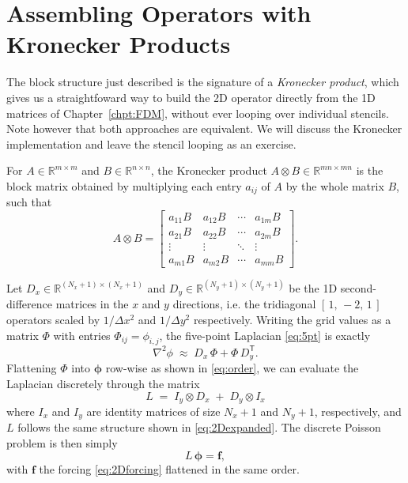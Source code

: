 \section{Assembling Operators with Kronecker Products}
\label{sec:kron}

The block structure just described is the
signature of a \emph{Kronecker product}, which gives us a straightfoward way to build the 2D
operator directly from the 1D matrices of Chapter~\ref{chpt:FDM}, without ever
looping over individual stencils. Note however that both approaches are equivalent. We will discuss the Kronecker implementation and leave the stencil looping as an exercise.

\clearpage 

\begin{definition}
For $A\in\mathbb{R}^{m\times m}$ and $B\in\mathbb{R}^{n\times n}$, the
Kronecker product $A\otimes B\in\mathbb{R}^{mn\times mn}$ is the block matrix
obtained by multiplying each entry $a_{ij}$ of $A$ by the whole matrix $B$, such that
\[
    A\otimes B =
    \begin{bmatrix}
        a_{11}B & a_{12}B & \cdots & a_{1m}B\\
        a_{21}B & a_{22}B & \cdots & a_{2m}B\\
        \vdots  & \vdots  & \ddots & \vdots \\
        a_{m1}B & a_{m2}B & \cdots & a_{mm}B
    \end{bmatrix}.
\]
\end{definition}

Let $D_x\in\mathbb{R}^{(N_x+1)\times(N_x+1)}$ and
$D_y\in\mathbb{R}^{(N_y+1)\times(N_y+1)}$ be the 1D second-difference matrices
in the $x$ and $y$ directions, i.e. the
tridiagonal $[\,1,\,-2,\,1\,]$ operators scaled by $1/\Delta x^2$ and
$1/\Delta y^2$ respectively. Writing the grid values as a matrix
$\Phi$ with entries $\Phi_{ij}=\phi_{i,j}$, the five-point Laplacian
\eqref{eq:5pt} is exactly
\[
    \nabla^2\phi \;\approx\; D_x\,\Phi + \Phi\,D_y^{\mathsf T}.
\]
Flattening $\Phi$ into $\boldsymbol{\phi}$ row-wise as shown in
\eqref{eq:order}, we can evaluate the Laplacian discretely through the matrix
\begin{equation}
    L \;=\; I_y\otimes D_x \;+\; D_y\otimes I_x
    \label{eq:2Dlaplacian-kron}
\end{equation}
where $I_x$ and $I_y$ are identity matrices of size $N_x+1$ and $N_y+1$, respectively, and $L$ follows the same structure shown in \eqref{eq:2Dexpanded}. The
discrete Poisson problem is then simply
\begin{equation}
    L\,\boldsymbol{\phi} = \boldsymbol{f},
    \label{eq:2Dsystem}
\end{equation}
with $\boldsymbol{f}$ the forcing \eqref{eq:2Dforcing} flattened in the same
order.



